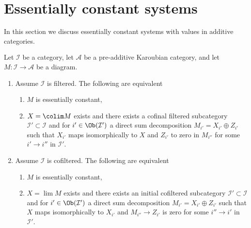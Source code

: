 \section{Essentially constant systems}
\label{section-essentially-constant}

\noindent
In this section we discuss essentially constant systems with values in
additive categories.

\begin{lemma}
\label{lemma-essentially-constant-into-karoubian}
Let $\mathcal{I}$ be a category, let $\mathcal{A}$ be a pre-additive
Karoubian category, and let $M : \mathcal{I} \to \mathcal{A}$ be a diagram.
\begin{enumerate}
\item Assume $\mathcal{I}$ is filtered. The following are equivalent
\begin{enumerate}
\item $M$ is essentially constant,
\item $X = \colim M$ exists and there exists a cofinal filtered subcategory
$\mathcal{I}' \subset \mathcal{I}$ and for $i' \in \Ob(\mathcal{I}')$
a direct sum decomposition $M_{i'} = X_{i'} \oplus Z_{i'}$ such that
$X_{i'}$ maps isomorphically to $X$ and $Z_{i'}$ to zero in $M_{i''}$
for some $i' \to i''$ in $\mathcal{I}'$.
\end{enumerate}
\item Assume $\mathcal{I}$ is cofiltered. The following are equivalent
\begin{enumerate}
\item $M$ is essentially constant,
\item $X = \lim M$ exists and there exists an initial cofiltered subcategory
$\mathcal{I}' \subset \mathcal{I}$ and for $i' \in \Ob(\mathcal{I}')$
a direct sum decomposition $M_{i'} = X_{i'} \oplus Z_{i'}$
such that $X$ maps isomorphically to $X_{i'}$ and $M_{i''} \to Z_{i'}$
is zero for some $i'' \to i'$ in $\mathcal{I}'$.
\end{enumerate}
\end{enumerate}
\end{lemma}

